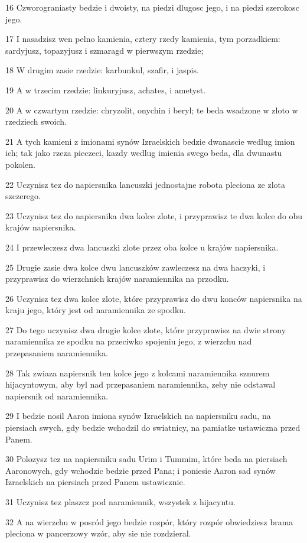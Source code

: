 \par 16 Czworograniasty bedzie i dwoisty, na piedzi dlugosc jego, i na piedzi szerokosc jego.
\par 17 I nasadzisz wen pelno kamienia, cztery rzedy kamienia, tym porzadkiem: sardyjusz, topazyjusz i szmaragd w pierwszym rzedzie;
\par 18 W drugim zasie rzedzie: karbunkul, szafir, i jaspis.
\par 19 A w trzecim rzedzie: linkuryjusz, achates, i ametyst.
\par 20 A w czwartym rzedzie: chryzolit, onychin i beryl; te beda wsadzone w zloto w rzedziech swoich.
\par 21 A tych kamieni z imionami synów Izraelskich bedzie dwanascie wedlug imion ich; tak jako rzeza pieczeci, kazdy wedlug imienia swego beda, dla dwunastu pokolen.
\par 22 Uczynisz tez do napiersnika lancuszki jednostajne robota pleciona ze zlota szczerego.
\par 23 Uczynisz tez do napiersnika dwa kolce zlote, i przyprawisz te dwa kolce do obu krajów napiersnika.
\par 24 I przewleczesz dwa lancuszki zlote przez oba kolce u krajów napiersnika.
\par 25 Drugie zasie dwa kolce dwu lancuszków zawleczesz na dwa haczyki, i przyprawisz do wierzchnich krajów naramiennika na przodku.
\par 26 Uczynisz tez dwa kolce zlote, które przyprawisz do dwu konców napiersnika na kraju jego, który jest od naramiennika ze spodku.
\par 27 Do tego uczynisz dwa drugie kolce zlote, które przyprawisz na dwie strony naramiennika ze spodku na przeciwko spojeniu jego, z wierzchu nad przepasaniem naramiennika.
\par 28 Tak zwiaza napiersnik ten kolce jego z kolcami naramiennika sznurem hijacyntowym, aby byl nad przepasaniem naramiennika, zeby nie odstawal napiersnik od naramiennika.
\par 29 I bedzie nosil Aaron imiona synów Izraelskich na napiersniku sadu, na piersiach swych, gdy bedzie wchodzil do swiatnicy, na pamiatke ustawiczna przed Panem.
\par 30 Polozysz tez na napiersniku sadu Urim i Tummim, które beda na piersiach Aaronowych, gdy wchodzic bedzie przed Pana; i poniesie Aaron sad synów Izraelskich na piersiach przed Panem ustawicznie.
\par 31 Uczynisz tez plaszcz pod naramiennik, wszystek z hijacyntu.
\par 32 A na wierzchu w posród jego bedzie rozpór, który rozpór obwiedziesz brama pleciona w pancerzowy wzór, aby sie nie rozdzieral.
